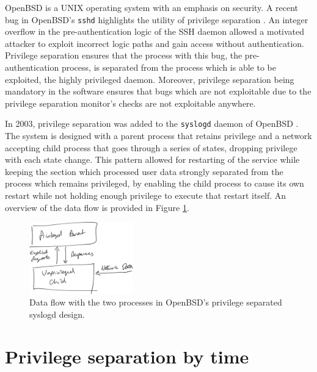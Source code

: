 \documentclass[12pt,a4paper,twoside]{report}
\begin{document}
OpenBSD is a UNIX operating system with an emphasis on security. A recent bug in OpenBSD's \texttt{sshd} highlights the utility of privilege separation \citep{the_openbsd_foundation_openssh_2022}. An integer overflow in the pre-authentication logic of the SSH daemon allowed a motivated attacker to exploit incorrect logic paths and gain access without authentication. Privilege separation ensures that the process with this bug, the pre-authentication process, is separated from the process which is able to be exploited, the highly privileged daemon. Moreover, privilege separation being mandatory in the software ensures that bugs which are not exploitable due to the privilege separation monitor's checks are not exploitable anywhere.

In 2003, privilege separation was added to the \texttt{syslogd} daemon of OpenBSD \citep{madhavapeddy_privsepc_2003}. The system is designed with a parent process that retains privilege and a network accepting child process that goes through a series of states, dropping privilege with each state change. This pattern allowed for restarting of the service while keeping the section which processed user data strongly separated from the process which remains privileged, by enabling the child process to cause its own restart while not holding enough privilege to execute that restart itself. An overview of the data flow is provided in Figure \ref{fig:openbsd-syslogd-privsep}.

\begin{figure}
    \centering
    \includegraphics[width=0.4\textwidth]{figures/openbsd-syslogd-privsep.png}
    \caption{Data flow with the two processes in OpenBSD's privilege separated syslogd design.}
    \label{fig:openbsd-syslogd-privsep}
\end{figure}

\section{Privilege separation by time}
\end{document}
